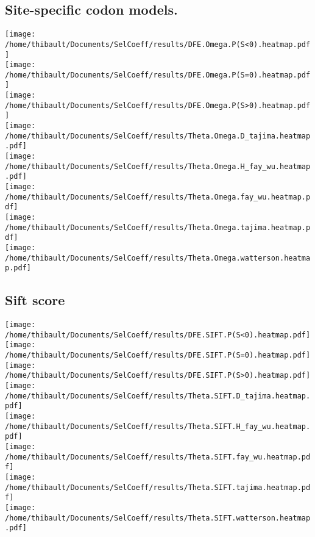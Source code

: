 \subsection{Site-specific codon models.} 
\begin{center}
\texttt{[image: /home/thibault/Documents/SelCoeff/results/DFE.Omega.P(S<0).heatmap.pdf]} \\
\texttt{[image: /home/thibault/Documents/SelCoeff/results/DFE.Omega.P(S=0).heatmap.pdf]} \\
\texttt{[image: /home/thibault/Documents/SelCoeff/results/DFE.Omega.P(S>0).heatmap.pdf]} \\
\texttt{[image: /home/thibault/Documents/SelCoeff/results/Theta.Omega.D\_tajima.heatmap.pdf]} \\
\texttt{[image: /home/thibault/Documents/SelCoeff/results/Theta.Omega.H\_fay\_wu.heatmap.pdf]} \\
\texttt{[image: /home/thibault/Documents/SelCoeff/results/Theta.Omega.fay\_wu.heatmap.pdf]} \\
\texttt{[image: /home/thibault/Documents/SelCoeff/results/Theta.Omega.tajima.heatmap.pdf]} \\
\texttt{[image: /home/thibault/Documents/SelCoeff/results/Theta.Omega.watterson.heatmap.pdf]} \\
\end{center}
\subsection{Sift score} 
\begin{center}
\texttt{[image: /home/thibault/Documents/SelCoeff/results/DFE.SIFT.P(S<0).heatmap.pdf]} \\
\texttt{[image: /home/thibault/Documents/SelCoeff/results/DFE.SIFT.P(S=0).heatmap.pdf]} \\
\texttt{[image: /home/thibault/Documents/SelCoeff/results/DFE.SIFT.P(S>0).heatmap.pdf]} \\
\texttt{[image: /home/thibault/Documents/SelCoeff/results/Theta.SIFT.D\_tajima.heatmap.pdf]} \\
\texttt{[image: /home/thibault/Documents/SelCoeff/results/Theta.SIFT.H\_fay\_wu.heatmap.pdf]} \\
\texttt{[image: /home/thibault/Documents/SelCoeff/results/Theta.SIFT.fay\_wu.heatmap.pdf]} \\
\texttt{[image: /home/thibault/Documents/SelCoeff/results/Theta.SIFT.tajima.heatmap.pdf]} \\
\texttt{[image: /home/thibault/Documents/SelCoeff/results/Theta.SIFT.watterson.heatmap.pdf]} \\
\end{center}
